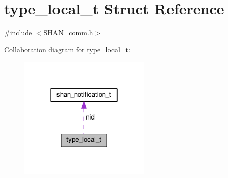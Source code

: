 \hypertarget{structtype__local__t}{}\section{type\+\_\+local\+\_\+t Struct Reference}
\label{structtype__local__t}


{\ttfamily \#include $<$S\+H\+A\+N\+\_\+comm.\+h$>$}



Collaboration diagram for type\+\_\+local\+\_\+t\+:\nopagebreak
\begin{figure}[H]
\begin{center}
\leavevmode
\includegraphics[width=178pt]{structtype__local__t__coll__graph}
\end{center}
\end{figure}

